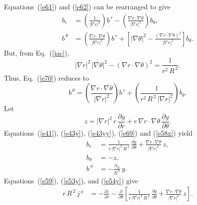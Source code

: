 \documentclass[12pt,prb,aps,notitlepage]{revtex4-1}
\begin{document}
Equations~(\ref{e61}) and (\ref{e62}) can be rearranged to give
\begin{align}
b_r &= \left(\frac{1}{|\nabla r|^2}\right)b^{\,r}- \left(\frac{\nabla r\cdot\nabla\theta}{|\nabla r|^2}\right)b_\theta,\label{e69}\\[0.5ex]
b^{\,\theta} &= \left(\frac{\nabla r\cdot\nabla\theta}{|\nabla r|^2}\right)b^{\,r} +\left[|\nabla\theta|^2 -\frac{(\nabla r\cdot\nabla\theta)^2}{|\nabla r|^2}\right]b_\theta.\label{e70}
\end{align}
But, from Eq.~(\ref{jac}), 
\begin{equation}
|\nabla r|^2\,|\nabla\theta|^2-(\nabla r \cdot\nabla\theta)^2 = \frac{1}{r^2\,R^{\,2}}.
\end{equation}
Thus, Eq.~(\ref{e70}) reduces to 
\begin{equation}\label{e58x}
b^{\,\theta} = \left(\frac{\nabla r\cdot\nabla\theta}{|\nabla r|^2}\right)b^{\,r} + \left(\frac{1}{r^2\,R^{\,2}\,|\nabla r|^2}\right) b_\theta.
\end{equation}
Let 
\begin{equation}\label{zdef}
z= |\nabla r|^2\,r\,\frac{\partial y}{\partial r} + r\,\nabla r\cdot\nabla\theta\,\frac{\partial y}{\partial\theta}.
\end{equation}
Equations~(\ref{e41}), (\ref{e43y}), (\ref{e43yy}), (\ref{e69}) and (\ref{e58x}) yield 
\begin{align}\label{e53y}
b_r &=\frac{1}{r\,|\nabla r|^2\,R^{\,2}}\,\frac{\partial y}{\partial \theta} + \frac{\nabla r\cdot\nabla\theta}{|\nabla r|^2}\,z,\\[0.5ex]
b_\theta &= -z,\label{e54y}\\[0.5ex]
b^{\,\phi} &= -\frac{\alpha_g}{R^{\,2}}\,y.\label{e55yy}
\end{align}
Equations~(\ref{e59}), (\ref{e53y}), and (\ref{e54y}) give
\begin{align}\label{e56yy}
r\,R^{\,2}\,j^{\,\phi} &=-\frac{\partial z}{\partial r}-\frac{\partial}{\partial\theta}\!\left[\frac{1}{r\,|\nabla r|^2\,R^{\,2}}\,\frac{\partial y}{\partial \theta} + \frac{\nabla r\cdot\nabla\theta}{|\nabla r|^2}\,z\right].
\end{align}
\end{document}
